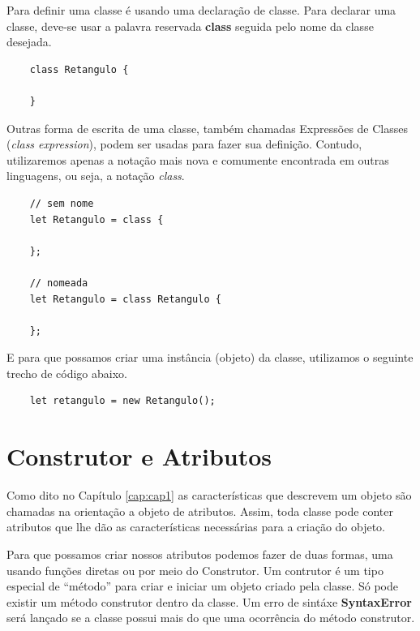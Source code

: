 Para definir uma classe é usando uma declaração de classe. Para declarar uma classe, deve-se usar a palavra reservada \textbf{class} seguida pelo nome da classe desejada.

\begin{verbatim}
	class Retangulo {
	
	}
\end{verbatim}

Outras forma de escrita de uma classe, também chamadas Expressões de Classes (\textit{class expression}), podem ser usadas para fazer sua definição. Contudo, utilizaremos apenas a notação mais nova e comumente encontrada em outras linguagens, ou seja, a notação \textit{class}.

\begin{verbatim}
	// sem nome
	let Retangulo = class {
		
	};
	
	// nomeada
	let Retangulo = class Retangulo {
		
	};
\end{verbatim}

E para que possamos criar uma instância (objeto) da classe, utilizamos o seguinte trecho de código abaixo.

\begin{verbatim}
	let retangulo = new Retangulo();
\end{verbatim}

\section{Construtor e Atributos}

Como dito no Capítulo \ref{cap:cap1} as características que descrevem um objeto são chamadas na orientação a objeto de atributos. Assim, toda classe pode conter atributos que lhe dão as características necessárias para a criação do objeto. 

Para que possamos criar nossos atributos podemos fazer de duas formas, uma usando funções diretas ou por meio do Construtor. Um contrutor é um tipo especial de ``método'' para criar e iniciar um objeto criado pela classe. Só pode existir um método construtor dentro da classe. Um erro de sintáxe \textbf{SyntaxError} será lançado se a classe possui mais do que uma ocorrência do método construtor. 

